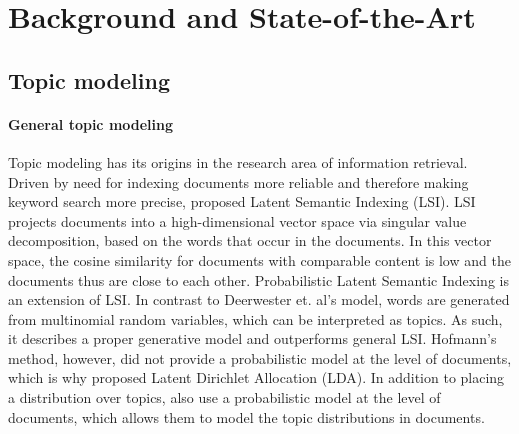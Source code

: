 \section{Background and State-of-the-Art}

\subsection{Topic modeling}
\paragraph{General topic modeling}Topic modeling has its origins in the research area of information retrieval. Driven by need for indexing documents more reliable and therefore making keyword search more precise, \citet{deerwesterscottindexing1990} proposed Latent Semantic Indexing (LSI). LSI projects documents into a high-dimensional vector space via singular value decomposition, based on the words that occur in the documents. In this vector space, the cosine similarity for documents with comparable content is low and the documents thus are close to each other. Probabilistic Latent Semantic Indexing \citep{hofmannprobabilistic1999} is an extension of LSI. In contrast to Deerwester et. al's model, words are generated from multinomial random variables, which can be interpreted as topics. As such, it describes a proper generative model and outperforms general LSI. Hofmann's method, however, did not provide a probabilistic model at the level of documents, which is why  \citet{bleilatent2003} proposed Latent Dirichlet Allocation (LDA). In addition to placing a distribution over topics, \citet{bleilatent2003} also use a probabilistic model at the level of documents, which allows them to model the topic distributions in documents.

